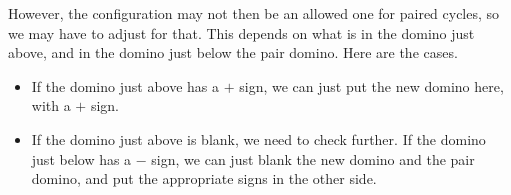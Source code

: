 \documentclass[12pt]{article}
\numberwithin{equation}{section}
\newcommand{\horizontalDominoMaybe}[3]{\filldraw [dominoMaybeStyle] (#2 - 1 + \eps, #1 - 1 + \eps) rectangle + (2 - \teps, 1 -\teps) node [dominoText] {$#3$};}
\newcommand{\verticalDominoMaybeShift}[4]{\filldraw [dominoMaybeStyle] (#2 - 1 + #4 + \eps,  #1 - 1 + \eps) rectangle + (1 - \teps,2 -\teps) node [dominoText] {$#3$};}
\begin{document}
\begin{itemize}
\begin{itemize}
\begin{itemize}
        However, the configuration may not then be an allowed one for paired cycles, so we may have to adjust for that.
        This depends on what is in the domino just above, and in the domino just below the pair domino.
        Here are the cases.
        \begin{itemize}
          \item If the domino just above has a $+$ sign, we can just put the new domino here, with a $+$ sign.
          \begin{figure}[H]
            \centering
          \end{figure}
          \begin{figure}[H]
            \centering
          \end{figure}
          \item If the domino just above is blank, we need to check further.
          If the domino just below has a $-$ sign, we can just blank the new domino and the pair domino, and put the appropriate signs in the other side.
          \begin{figure}[H]
            \centering
\end{figure}
\end{itemize}
\end{itemize}
\end{itemize}
\end{itemize}
\end{document}
